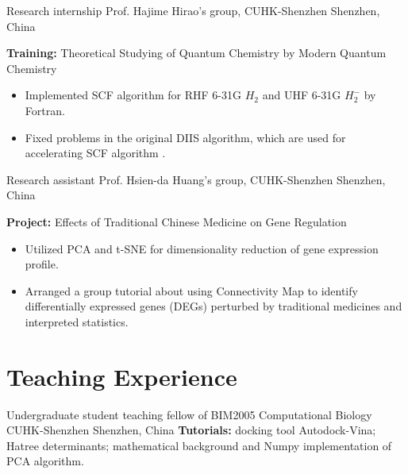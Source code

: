 \documentclass[11pt]{moderncv}
\begin{document}
{Research internship}
{Prof. Hajime Hirao's group, CUHK-Shenzhen}
{Shenzhen, China}
{}
{\textbf{Training:} Theoretical Studying of Quantum Chemistry by Modern Quantum Chemistry
    \begin{itemize}\setlength\itemsep{-1pt}
    \item Implemented SCF algorithm for RHF 6-31G ${H_2}$ and UHF 6-31G ${H_2^-}$ by Fortran.
    \item Fixed problems in the original DIIS algorithm, which are used for accelerating SCF algorithm .
\end{itemize}
}

{Research assistant}
{Prof. Hsien-da Huang's group, CUHK-Shenzhen}
{Shenzhen, China}
{}
{\textbf {Project:} Effects of Traditional Chinese Medicine on Gene Regulation
    \begin{itemize}\setlength\itemsep{-1pt}
    \item Utilized PCA and t-SNE for dimensionality reduction of gene expression profile.
    \item Arranged a group tutorial about using Connectivity Map to identify differentially expressed genes (DEGs) perturbed by traditional medicines and interpreted statistics. 
    \end{itemize}
}

\vspace{-0.75em}
\nocite{*}
\printbibliography[title={Publications}]
\vspace{-0.75em}

\vspace{-0.75em}
\section{Teaching Experience}
{Undergraduate student teaching fellow of BIM2005 Computational Biology}
{CUHK-Shenzhen}
{Shenzhen, China}
{}
{\textbf{Tutorials:} docking tool Autodock-Vina; 
Hatree determinants; 
mathematical background and Numpy implementation of PCA algorithm.}
\end{document}
